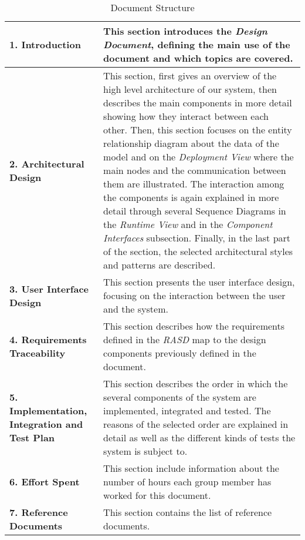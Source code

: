 \begin{center}
\centering
\begin{table}[H]
\centering
\begin{tabular} { p{4cm}  p{10 cm} }
\toprule
\textbf{1. Introduction} & This section introduces the \textit{Design Document}, defining the main use of the document and which topics are covered.                                                                                                                                  \\ \midrule
\textbf{2. Architectural Design} & This section, first gives an overview of the high level architecture of our system, then describes the main components in more detail showing how they interact between each other. Then, this section focuses on the entity relationship diagram about the data of the model and on the \textit{Deployment View} where the main nodes and the communication between them are illustrated. The interaction among the components is again explained in more detail through several Sequence Diagrams in the \textit{Runtime View} and in the \textit{Component Interfaces} subsection. Finally, in the last part of the section, the selected architectural styles and patterns are described. \\ \midrule
\textbf{3. User Interface Design} &  This section presents the user interface design, focusing on the interaction between the user and the system.  \\ \midrule
\textbf{4. Requirements Traceability}  & This section describes how the requirements defined in the \textit{RASD} map to the design components previously defined in the document.\\ \midrule
\textbf{5. Implementation, Integration and Test Plan} &  This section describes the order in which the several components of the system are implemented, integrated and tested. The reasons of the selected order are explained in detail as well as the different kinds of tests the system is subject to.
\\ \midrule
\textbf {6. Effort Spent} & This section include information about the number of hours each group member has worked for this document. \\ \midrule
\textbf{7. Reference Documents} & This section contains the list of  reference documents. \\ \bottomrule
\end{tabular}
\caption{Document Structure}
\end{table}
\clearpage
\end{center}
\clearpage